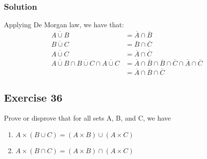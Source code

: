 \documentclass{article}
\theoremstyle{mytheoremstyle}
\theoremstyle{mytheoremstyle}
\theoremstyle{myproblemstyle}
\begin{document}
    \subsubsection*{Solution}
        Applying De Morgan law, we have that:
            \begin{align*}
                \overline{A \cup B} &= \overline{A} \cap \overline{B}\\
                \overline{B \cup C} &= \overline{B} \cap \overline{C}\\
                \overline{A \cup C} &= \overline{A} \cap \overline{C}\\
                \overline{A \cup B} \cap \overline{B \cup C} \cap \overline{A \cup C} &= \overline{A} \cap \overline{B} \cap \overline{B} \cap \overline{C} \cap \overline{A} \cap \overline{C}\\
                &= \overline{A} \cap \overline{B} \cap \overline{C}
            \end{align*}
    \subsection*{Exercise 36}
        Prove or disprove that for all sets A, B, and C, we have
        \begin{enumerate} [label = (\alph*)]
            \item \(A \times (B \cup C) = (A \times B) \cup (A \times C)\)
            \item \(A \times (B \cap C) = (A \times B) \cap (A \times C)\)
        \end{enumerate}
\end{document}
